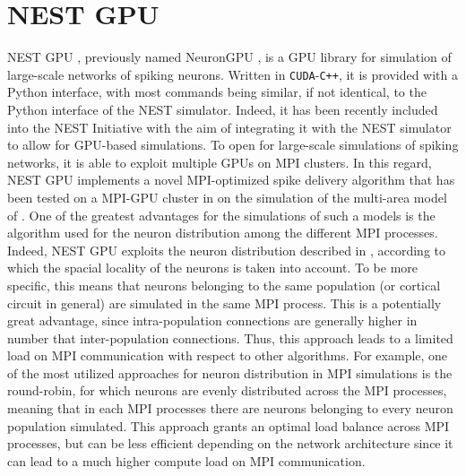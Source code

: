 \documentclass[a4paper, 12pt, twoside, openright]{book}
\begin{document}
\section{NEST GPU}
NEST GPU \cite{Tiddia2022}, previously named NeuronGPU \cite{Golosio2021}, is a GPU library for simulation of large-scale networks of spiking neurons. Written in \verb!CUDA!-\verb!C++!, it is provided with a Python interface, with most commands being similar, if not identical, to the Python interface of the NEST simulator. Indeed, it has been recently included into the NEST Initiative with the aim of integrating it with the NEST simulator to allow for GPU-based simulations. To open for large-scale simulations of spiking networks, it is able to exploit multiple GPUs on MPI clusters. In this regard, NEST GPU implements a novel MPI-optimized spike delivery algorithm that has been tested on a MPI-GPU cluster in \cite{Tiddia2022} on the simulation of the multi-area model of \cite{Schuecker2017, Schmidt2018b, Schmidt2018}. One of the greatest advantages for the simulations of such a models is the algorithm used for the neuron distribution among the different MPI processes. Indeed, NEST GPU exploits the neuron distribution described in \cite{Pastorelli2019}, according to which the spacial locality of the neurons is taken into account. To be more specific, this means that neurons belonging to the same population (or cortical circuit in general) are simulated in the same MPI process. This is a potentially great advantage, since intra-population connections are generally higher in number that inter-population connections. Thus, this approach leads to a limited load on MPI communication with respect to other algorithms. For example, one of the most utilized approaches for neuron distribution in MPI simulations is the round-robin, for which neurons are evenly distributed across the MPI processes, meaning that in each MPI processes there are neurons belonging to every neuron population simulated. This approach grants an optimal load balance across MPI processes, but can be less efficient depending on the network architecture since it can lead to a much higher compute load on MPI communication.\\
\end{document}
